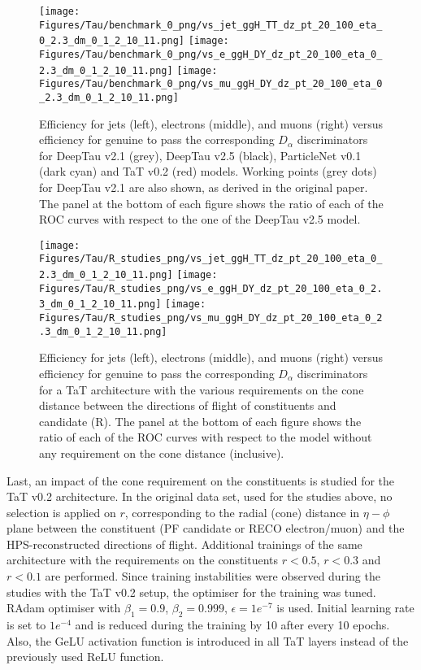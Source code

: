 \begin{figure}[!t]
    \centering
    \texttt{[image: Figures/Tau/benchmark\_0\_png/vs\_jet\_ggH\_TT\_dz\_pt\_20\_100\_eta\_0\_2.3\_dm\_0\_1\_2\_10\_11.png]}
    \texttt{[image: Figures/Tau/benchmark\_0\_png/vs\_e\_ggH\_DY\_dz\_pt\_20\_100\_eta\_0\_2.3\_dm\_0\_1\_2\_10\_11.png]}
    \texttt{[image: Figures/Tau/benchmark\_0\_png/vs\_mu\_ggH\_DY\_dz\_pt\_20\_100\_eta\_0\_2.3\_dm\_0\_1\_2\_10\_11.png]}
    \caption{Efficiency for jets (left), electrons (middle), and muons (right) versus efficiency for genuine \tauh to pass the corresponding $D_\alpha$ discriminators for DeepTau v2.1 (grey), DeepTau v2.5 (black), ParticleNet v0.1 (dark cyan) and TaT v0.2 (red) models. Working points (grey dots) for DeepTau v2.1 are also shown, as derived in the original paper. The panel at the bottom of each figure shows the ratio of each of the ROC curves with respect to the one of the DeepTau v2.5 model.}
    \label{fig:benchmark}
\end{figure}

\begin{figure}[!t]
    \centering
    \texttt{[image: Figures/Tau/R\_studies\_png/vs\_jet\_ggH\_TT\_dz\_pt\_20\_100\_eta\_0\_2.3\_dm\_0\_1\_2\_10\_11.png]}
    \texttt{[image: Figures/Tau/R\_studies\_png/vs\_e\_ggH\_DY\_dz\_pt\_20\_100\_eta\_0\_2.3\_dm\_0\_1\_2\_10\_11.png]}
    \texttt{[image: Figures/Tau/R\_studies\_png/vs\_mu\_ggH\_DY\_dz\_pt\_20\_100\_eta\_0\_2.3\_dm\_0\_1\_2\_10\_11.png]}
    \caption{Efficiency for jets (left), electrons (middle), and muons (right) versus efficiency for genuine \tauh to pass the corresponding $D_\alpha$ discriminators for a TaT architecture with the various requirements on the cone distance between the directions of flight of constituents and \tauh candidate (R). The panel at the bottom of each figure shows the ratio of each of the ROC curves with respect to the model without any requirement on the cone distance (inclusive).}
    \label{fig:r_benchmark}
\end{figure}
Last, an impact of the cone requirement on the constituents is studied for the TaT v0.2 architecture. In the original data set, used for the studies above, no selection is applied on $r$, corresponding to the radial (cone) distance in $\eta-\phi$ plane between the constituent (PF candidate or RECO electron/muon) and the HPS-reconstructed \tauh directions of flight. Additional trainings of the same architecture with the requirements on the constituents $r<0.5$, $r<0.3$ and $r<0.1$ are performed. Since training instabilities were observed during the studies with the TaT v0.2 setup, the optimiser for the training was tuned. RAdam \cite{liu2019variance} optimiser with $\beta_1=0.9$, $\beta_2=0.999$, $\epsilon=1e^{-7}$ is used. Initial learning rate is set to $1e^{-4}$ and is reduced during the training by 10 after every 10 epochs.  Also, the GeLU activation function \cite{hendrycks2016gaussian} is introduced in all TaT layers instead of the previously used ReLU function.

